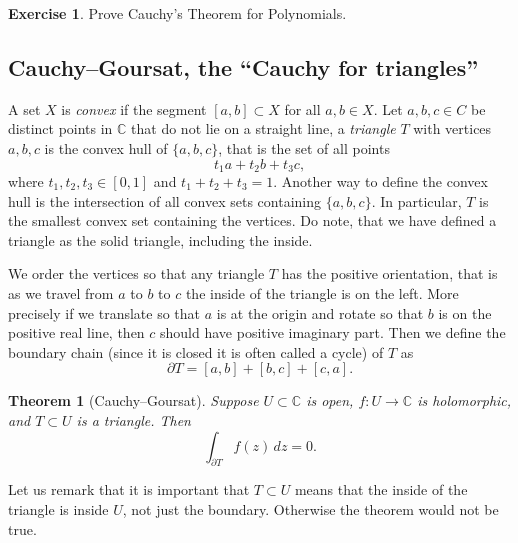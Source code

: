 \documentclass[12pt,openany]{book}
\newcommand{\C}{{\mathbb{C}}}
\newcommand{\myindex}[1]{#1\index{#1}}
\theoremstyle{plain}
\newtheorem{thm}{Theorem}[section]
\theoremstyle{remark}
\theoremstyle{definition}
\newenvironment{exbox}{%
    \def\FrameCommand{\vrule width 1pt \relax\hspace {10pt}}%
    \MakeFramed {\advance \hsize -\width \FrameRestore }%
}{%
    \endMakeFramed
}
\theoremstyle{exercise}
\newtheorem{exercise}{Exercise}[section]
\theoremstyle{example}
\begin{document}
\begin{exbox}
\begin{exercise}
Prove Cauchy's Theorem for Polynomials.
\end{exercise}
\end{exbox}

\subsection{Cauchy--Goursat, the ``Cauchy for triangles''}

A set $X$ is \emph{\myindex{convex}} if the segment $[a,b] \subset X$ for all $a,b \in
X$.
Let $a,b,c \in C$ be distinct points in $\C$ that do not lie on a
straight line, a \emph{\myindex{triangle}} $T$
with vertices $a,b,c$ is the convex hull
of $\{ a,b,c \}$, that is
the set of all points
\begin{equation*}
t_1 a + t_2 b + t_3 c ,
\end{equation*}
where $t_1,t_2,t_3 \in [0,1]$ and $t_1+t_2+t_3 = 1$.  Another way to define
the convex hull is the intersection of all convex sets containing $\{ a,b,c \}$.
In particular, $T$ is the smallest convex set containing the vertices.
Do note, that we have defined a triangle as the solid triangle, including
the inside.

We order the vertices so that any triangle $T$ has the positive orientation,
that is as we travel from $a$ to $b$ to $c$ the inside of the triangle 
is on the left.  More precisely if we translate so that $a$ is
at the origin and rotate so that $b$ is on the positive real line, then $c$
should have positive imaginary part.  Then we define the boundary chain
(since it is closed it is often called a cycle) of $T$ as
\begin{equation*}
\partial T = [a,b] + [b,c] + [c,a] .
\end{equation*}

\begin{thm}[Cauchy--Goursat]
Suppose $U \subset \C$ is open, $f \colon U \to \C$ is holomorphic,
and $T \subset U$ is a triangle.  Then
\begin{equation*}
\int_{\partial T} f(z) \, dz = 0 .
\end{equation*}
\end{thm}

Let us remark that it is important that $T \subset U$ means that the inside
of the triangle is inside $U$, not just the boundary.  Otherwise the theorem
would not be true.
\end{document}
